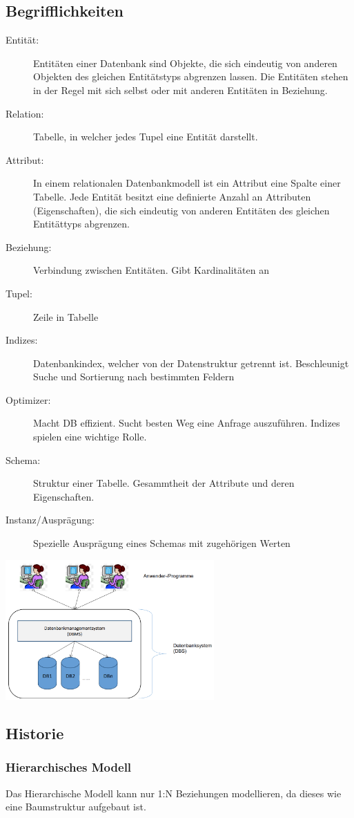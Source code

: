 \documentclass[12pt,a4paper]{article}
\begin{document}
	\subsection{Begrifflichkeiten}
	\begin{description}
		\item[Entität:] Entitäten einer Datenbank sind Objekte, die sich eindeutig von anderen Objekten des gleichen Entitätstyps abgrenzen lassen. Die Entitäten stehen in der Regel mit sich selbst oder mit anderen Entitäten in Beziehung.
		\item[Relation:] Tabelle, in welcher jedes Tupel  eine Entität darstellt.
		\item[Attribut:] In einem relationalen Datenbankmodell ist ein Attribut eine Spalte einer Tabelle. Jede Entität besitzt eine definierte Anzahl an Attributen (Eigenschaften), die sich eindeutig von anderen Entitäten des gleichen Entitättyps abgrenzen.
		\item[Beziehung:] Verbindung zwischen Entitäten. Gibt Kardinalitäten an
		\item[Tupel:] Zeile in Tabelle
		\item[Indizes:] Datenbankindex, welcher von der Datenstruktur getrennt ist. Beschleunigt Suche und Sortierung nach bestimmten Feldern
		\item[Optimizer:] Macht DB effizient. Sucht besten Weg eine Anfrage auszuführen. Indizes spielen eine wichtige Rolle.
		\item[Schema:] Struktur einer Tabelle. Gesammtheit der Attribute und deren Eigenschaften.
		\item[Instanz/Ausprägung:] Spezielle Ausprägung eines Schemas mit zugehörigen Werten
	\end{description}
	\includegraphics[width=0.6\textwidth]{Bilder/Begriffe.PNG}

	\subsection{Historie}
		\subsubsection{Hierarchisches Modell}
			Das Hierarchische Modell kann nur 1:N Beziehungen modellieren, da dieses wie eine Baumstruktur aufgebaut ist. 
		
\end{document}
